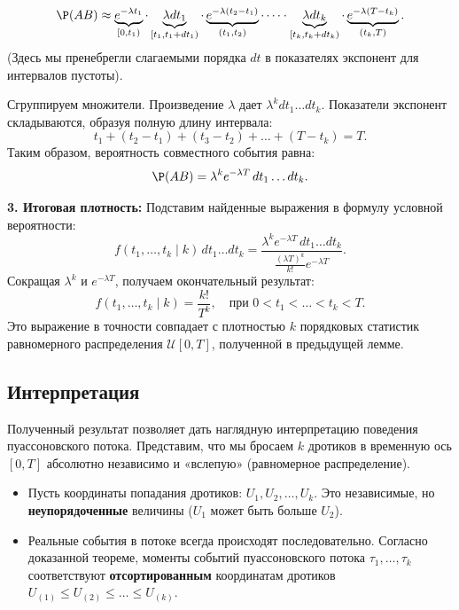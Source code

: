 \begin{tproof}
$$
\P(AB) \approx \underbrace{e^{-\lambda t_1}}_{[0, t_1)} \cdot \underbrace{\lambda dt_1}_{[t_1, t_1+dt_1)} \cdot \underbrace{e^{-\lambda(t_2 - t_1)}}_{(t_1, t_2)} \cdot \dots \cdot \underbrace{\lambda dt_k}_{[t_k, t_k+dt_k)} \cdot \underbrace{e^{-\lambda(T - t_k)}}_{(t_k, T)}.
$$
(Здесь мы пренебрегли слагаемыми порядка $dt$ в показателях экспонент для интервалов пустоты).

Сгруппируем множители. Произведение $\lambda$ дает $\lambda^k dt_1 \dots dt_k$. Показатели экспонент складываются, образуя полную длину интервала:
$$
t_1 + (t_2 - t_1) + (t_3 - t_2) + \dots + (T - t_k) = T.
$$
Таким образом, вероятность совместного события равна:
$$ \P(AB) = \lambda^k e^{-\lambda T} \, dt_1 \dots dt_k. $$

\textbf{3. Итоговая плотность:}
Подставим найденные выражения в формулу условной вероятности:
$$
f(t_1, \dots, t_k \mid k) \, dt_1 \dots dt_k = \frac{\lambda^k e^{-\lambda T} \, dt_1 \dots dt_k}{\frac{(\lambda T)^k}{k!} e^{-\lambda T}}.
$$
Сокращая $\lambda^k$ и $e^{-\lambda T}$, получаем окончательный результат:
$$
f(t_1, \dots, t_k \mid k) = \frac{k!}{T^k}, \quad \text{при } 0 < t_1 < \dots < t_k < T.
$$
Это выражение в точности совпадает с плотностью $k$ порядковых статистик равномерного распределения $\mathcal{U}[0, T]$, полученной в предыдущей лемме.
\end{tproof}

\subsection{Интерпретация}

Полученный результат позволяет дать наглядную интерпретацию поведения пуассоновского потока. Представим, что мы бросаем $k$ дротиков в временную ось $[0, T]$ абсолютно независимо и «вслепую» (равномерное распределение).

\begin{itemize}
    \item Пусть координаты попадания дротиков: $U_1, U_2, \dots, U_k$. Это независимые, но \textbf{неупорядоченные} величины ($U_1$ может быть больше $U_2$).
    \item Реальные события в потоке всегда происходят последовательно. Согласно доказанной теореме, моменты событий пуассоновского потока $\tau_1, \dots, \tau_k$ соответствуют \textbf{отсортированным} координатам дротиков $U_{(1)} \le U_{(2)} \le \dots \le U_{(k)}$.
\end{itemize}

